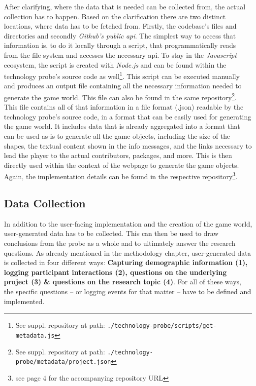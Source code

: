After clarifying, where the data that is needed can be collected from, the actual collection has to happen. Based on the clarification there are two distinct locations, where data has to be fetched from. Firstly, the codebase's files and directories and secondly \textit{Github's public \gls{api}}. The simplest way to access that information is, to do it locally through a script, that programmatically reads from the file system and accesses the necessary \gls{api}. To stay in the \textit{Javascript} ecosystem, the script is created with \textit{Node.js} and can be found within the technology probe's source code as well\footnote{See suppl. repository at path: \texttt{./technology-probe/scripts/get-metadata.js}}. This script can be executed manually and produces an output file containing all the necessary information needed to generate the game world. This file can also be found in the same repository\footnote{See suppl. repository at path: \texttt{./technology-probe/metadata/project.json}}. This file contains all of that information in a file format (.json) readable by the technology probe's source code, in a format that can be easily used for generating the game world. It includes data that is already aggregated into a format that can be used as-is to generate all the game objects, including the size of the shapes, the textual content shown in the info messages, and the links necessary to lead the player to the actual contributors, packages, and more. This is then directly used within the context of the webpage to generate the game objects. Again, the implementation details can be found in the respective repository\footnote{see page 4 for the accompanying repository URL}.

\subsection{Data Collection}

In addition to the user-facing implementation and the creation of the game world, user-generated data has to be collected. This can then be used to draw conclusions from the probe as a whole and to ultimately answer the research questions. As already mentioned in the methodology chapter, user-generated data is collected in four different ways: \textbf{Capturing demographic information (1), logging participant interactions (2), questions on the underlying project (3) \& questions on the research topic (4)}. For all of these ways, the specific questions -- or logging events for that matter -- have to be defined and implemented.

